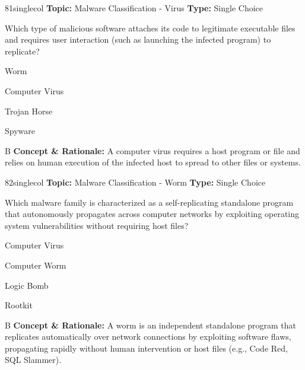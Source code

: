 \begin{qcard}{81}{singlecol}
\textcolor{darkslate!75}{\small\textbf{Topic:} Malware Classification - Virus \hfill \textbf{Type:} Single Choice}\vspace{0.4em}\par
Which type of malicious software attaches its code to legitimate executable files and requires user interaction (such as launching the infected program) to replicate?
\begin{qoptions}
\item Worm
\item Computer Virus
\item Trojan Horse
\item Spyware
\end{qoptions}
\end{qcard}
\nopagebreak
\begin{explainbox}{B}
\textbf{Concept \& Rationale:} A computer virus requires a host program or file and relies on human execution of the infected host to spread to other files or systems.
\end{explainbox}

\begin{qcard}{82}{singlecol}
\textcolor{darkslate!75}{\small\textbf{Topic:} Malware Classification - Worm \hfill \textbf{Type:} Single Choice}\vspace{0.4em}\par
Which malware family is characterized as a self-replicating standalone program that autonomously propagates across computer networks by exploiting operating system vulnerabilities without requiring host files?
\begin{qoptions}
\item Computer Virus
\item Computer Worm
\item Logic Bomb
\item Rootkit
\end{qoptions}
\end{qcard}
\nopagebreak
\begin{explainbox}{B}
\textbf{Concept \& Rationale:} A worm is an independent standalone program that replicates automatically over network connections by exploiting software flaws, propagating rapidly without human intervention or host files (e.g., Code Red, SQL Slammer).
\end{explainbox}

